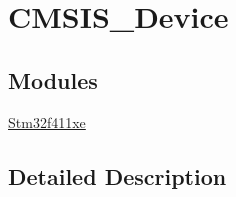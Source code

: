\hypertarget{group___c_m_s_i_s___device}{}\section{C\+M\+S\+I\+S\+\_\+\+Device}
\label{group___c_m_s_i_s___device}
\subsection*{Modules}
\begin{DoxyCompactItemize}
\item 
\hyperlink{group__stm32f411xe}{Stm32f411xe}
\end{DoxyCompactItemize}


\subsection{Detailed Description}
